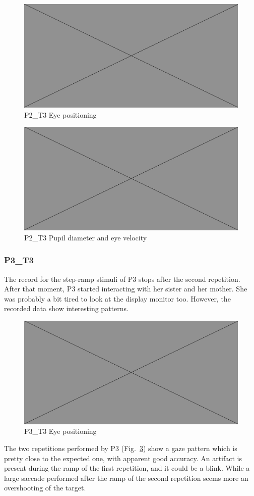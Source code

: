 \begin{figure}[h]
  \centering
  \includegraphics[width=.5\textwidth]{figures/placeholderImg.jpg}
  \caption[P2\_T3 Eye positioning]{P2\_T3 Eye positioning}
  \label{fig:P2_T3_pos}
\end{figure}

\begin{figure}[h]
  \centering
  \includegraphics[width=.5\textwidth]{figures/placeholderImg.jpg}
  \caption[P2\_T3 pupil velocity]{P2\_T3 Pupil diameter and eye velocity}
  \label{fig:P2_T3_vel}
\end{figure}


\subsubsection{P3\_T3}
\label{sec:P3_T3}

The record for the step-ramp stimuli of P3 stops after the second repetition. After that moment, P3 started interacting with her sister and her mother. She was probably a bit tired to look at the display monitor too. However, the recorded data show interesting patterns.

\begin{figure}[h]
  \centering
  \includegraphics[width=.5\textwidth]{figures/placeholderImg.jpg}
  \caption[P3\_T3 Eye positioning]{P3\_T3 Eye positioning}
  \label{fig:P3_T3_pos}
\end{figure}

The two repetitions performed by P3 (Fig.~\ref{fig:P3_T3_pos})  show a gaze pattern which is pretty close to the expected one, with apparent good accuracy. An artifact is present during the ramp of the first repetition, and it could be a blink. While a large saccade performed after the ramp of the second repetition seems more an overshooting of the target.

